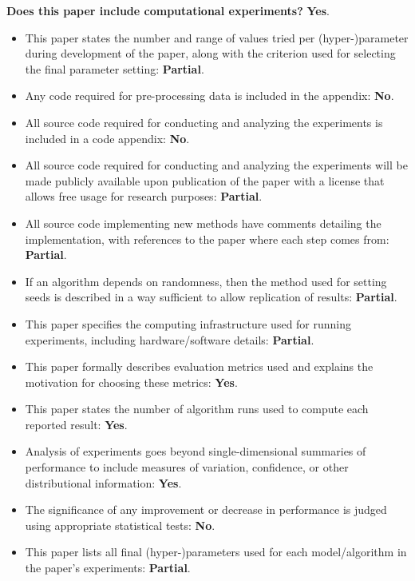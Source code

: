 ﻿\documentclass[letterpaper]{article}
\begin{document}
\noindent\textbf{Does this paper include computational experiments?} \textbf{Yes}.
\begin{itemize}
\item This paper states the number and range of values tried per (hyper-)parameter during development of the paper, along with the criterion used for selecting the final parameter setting: \textbf{Partial}.
\item Any code required for pre-processing data is included in the appendix: \textbf{No}.
\item All source code required for conducting and analyzing the experiments is included in a code appendix: \textbf{No}.
\item All source code required for conducting and analyzing the experiments will be made publicly available upon publication of the paper with a license that allows free usage for research purposes: \textbf{Partial}.
\item All source code implementing new methods have comments detailing the implementation, with references to the paper where each step comes from: \textbf{Partial}.
\item If an algorithm depends on randomness, then the method used for setting seeds is described in a way sufficient to allow replication of results: \textbf{Partial}.
\item This paper specifies the computing infrastructure used for running experiments, including hardware/software details: \textbf{Partial}.
\item This paper formally describes evaluation metrics used and explains the motivation for choosing these metrics: \textbf{Yes}.
\item This paper states the number of algorithm runs used to compute each reported result: \textbf{Yes}.
\item Analysis of experiments goes beyond single-dimensional summaries of performance to include measures of variation, confidence, or other distributional information: \textbf{Yes}.
\item The significance of any improvement or decrease in performance is judged using appropriate statistical tests: \textbf{No}.
\item This paper lists all final (hyper-)parameters used for each model/algorithm in the paper's experiments: \textbf{Partial}.
\end{itemize}
\end{document}
